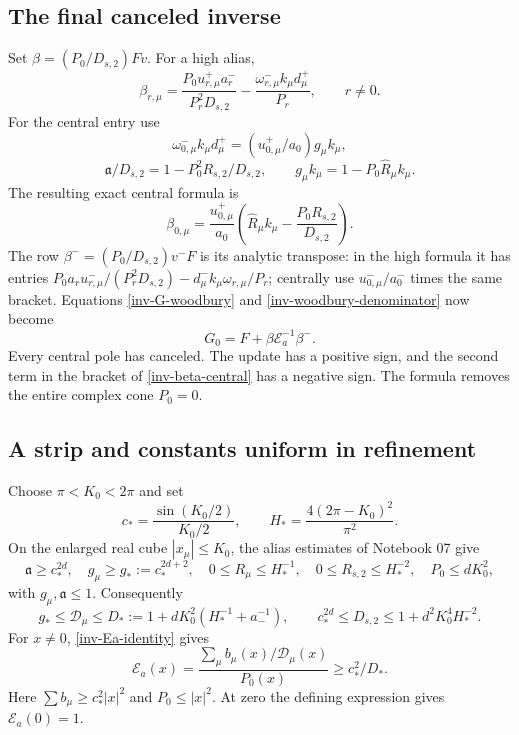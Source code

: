 \subsection{The final canceled inverse}

Set $\beta=(P_0/D_{s,2})Fv$. For a high alias,
\begin{equation}\label{inv-beta-high}
 \beta_{r,\mu}
 =\frac{P_0u_{r,\mu}^+a_r^-}{P_r^2D_{s,2}}
 -\frac{\omega_{r,\mu}^-k_\mu d_\mu^+}{P_r},
 \qquad r\ne0.
\end{equation}
For the central entry use
\[
 \omega_{0,\mu}^-k_\mu d_\mu^+
 =(u_{0,\mu}^+/a_0)g_\mu k_\mu,
\]
\[
 \mathfrak a/D_{s,2}=1-P_0^2R_{s,2}/D_{s,2},\qquad
 g_\mu k_\mu=1-P_0\widehat R_\mu k_\mu.
\]
The resulting exact central formula is
\begin{equation}\label{inv-beta-central}
 \beta_{0,\mu}=
 \frac{u_{0,\mu}^+}{a_0}
 \left(\widehat R_\mu k_\mu
                  -\frac{P_0R_{s,2}}{D_{s,2}}\right).
\end{equation}
The row $\beta^-=(P_0/D_{s,2})v^-F$ is its analytic transpose:
in the high formula it has entries
$P_0a_ru_{r,\mu}^-/(P_r^2D_{s,2})
-d_\mu^-k_\mu\omega_{r,\mu}/P_r$; centrally use
$u_{0,\mu}^-/a_0^-$ times the same bracket.
Equations \eqref{inv-G-woodbury} and
\eqref{inv-woodbury-denominator} now become
\begin{equation}\label{inv-final-formula}
 \boxed{\displaystyle G_0=F+\beta\mathcal E_a^{-1}\beta^-.}
\end{equation}
Every central pole has canceled. The update has a positive sign, and
the second term in the bracket of \eqref{inv-beta-central} has a
negative sign. The formula removes the entire complex cone $P_0=0$.

\subsection{A strip and constants uniform in refinement}

Choose $\pi<K_0<2\pi$ and set
\[
 c_* =\frac{\sin(K_0/2)}{K_0/2},\qquad
 H_* =\frac{4(2\pi-K_0)^2}{\pi^2}.
\]
On the enlarged real cube $|x_\mu|\le K_0$, the alias estimates of
Notebook 07 give
\[
 \mathfrak a\ge c_*^{2d},\quad
 g_\mu\ge g_*:=c_*^{2d+2},\quad
 0\le R_\mu\le H_*^{-1},\quad
 0\le R_{s,2}\le H_*^{-2},\quad P_0\le dK_0^2,
\]
with $g_\mu,\mathfrak a\le1$. Consequently
\[
 g_*\le\mathcal D_\mu\le
 D_*:=1+dK_0^2(H_*^{-1}+a_-^{-1}),\qquad
 c_*^{2d}\le D_{s,2}\le1+d^2K_0^4H_*^{-2}.
\]
For $x\ne0$, \eqref{inv-Ea-identity} gives
\begin{equation}\label{inv-Ea-lower}
 \mathcal E_a(x)=
 \frac{\sum_\mu b_\mu(x)/\mathcal D_\mu(x)}{P_0(x)}
 \ge c_*^2/D_*.
\end{equation}
Here $\sum b_\mu\ge c_*^2|x|^2$ and $P_0\le|x|^2$.
At zero the defining expression gives $\mathcal E_a(0)=1$.

